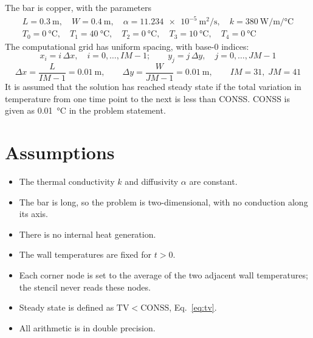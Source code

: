 \documentclass[conf]{new-aiaa}
\begin{document}
The bar is copper, with the parameters
\begin{equation}
  \begin{gathered}
    L = \SI{0.3}{\metre}, \quad W = \SI{0.4}{\metre}, \quad
    \alpha = \SI{11.234e-5}{\metre\squared\per\second}, \quad
    k = \SI{380}{\watt\per\metre\per\degreeCelsius} \\
    T_0 = \SI{0}{\degreeCelsius}, \quad T_1 = \SI{40}{\degreeCelsius}, \quad
    T_2 = \SI{0}{\degreeCelsius}, \quad T_3 = \SI{10}{\degreeCelsius}, \quad
    T_4 = \SI{0}{\degreeCelsius}
  \end{gathered}
  \label{eq:params}
\end{equation}
The computational grid has uniform spacing, with base-0 indices:
\begin{equation}
  x_i = i\,\Delta x, \quad i = 0, \dots, \mathit{IM}-1; \qquad
  y_j = j\,\Delta y, \quad j = 0, \dots, \mathit{JM}-1
  \label{eq:grid}
\end{equation}
\begin{equation}
  \Delta x = \frac{L}{\mathit{IM} - 1} = \SI{0.01}{\metre}, \qquad
  \Delta y = \frac{W}{\mathit{JM} - 1} = \SI{0.01}{\metre}, \qquad
  \mathit{IM} = 31,\; \mathit{JM} = 41
  \label{eq:spacing}
\end{equation}
It is assumed that the solution has reached steady state 
if the total variation in temperature from one time point to the next is less than CONSS. CONSS is given as 
\SI{0.01}{\degreeCelsius} in the problem statement. 
\section{Assumptions}
\begin{itemize}
  \item The thermal conductivity $k$ and diffusivity $\alpha$ are constant.
  \item The bar is long, so the problem is two-dimensional, with no conduction along its axis.
  \item There is no internal heat generation.
  \item The wall temperatures are fixed for $t > 0$.
  \item Each corner node is set to the average of the two adjacent wall temperatures; the stencil never reads these nodes.
  \item Steady state is defined as $\mathrm{TV} < \mathrm{CONSS}$, Eq.~\eqref{eq:tv}.
  \item All arithmetic is in double precision.
\end{itemize}
\end{document}
